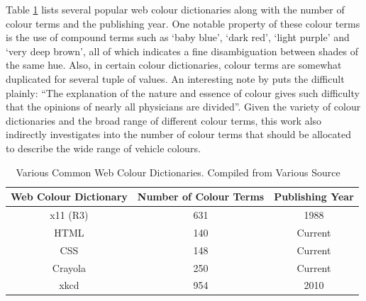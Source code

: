 Table \ref{table:allcolourterms} lists several popular web colour dictionaries
along with the number of colour terms and the publishing year. One
notable property of these colour terms is the use of compound terms such as
`baby blue', `dark red', `light purple' and `very deep brown', all of which indicates a fine disambiguation between shades of the same hue.
Also, in certain colour dictionaries, colour terms are somewhat duplicated for several tuple of values. An interesting note by  puts the difficult plainly: ``The explanation of the nature and essence of colour gives such difficulty that the opinions of nearly all physicians are divided''. Given the variety of colour dictionaries and the broad range of different colour terms, this work also indirectly investigates into the number of colour terms that should be allocated to describe the wide range of vehicle colours.

\begin{table}[hbt!]
 \centering
 \begin{tabular}{|c|c|c|} \hline
 \multicolumn{1}{|c|}{\textbf{Web Colour Dictionary}} &
 \multicolumn{1}{c|}{\textbf{Number of Colour Terms}} &
 \multicolumn{1}{c|}{\textbf{Publishing Year}} \\ \hline x11 (R3)
 & 631                         & 1988
 \\ \hline HTML                        & 140
 & Current              \\ \hline CSS
 & 148                         & Current
 \\ \hline Crayola                       & 250
 & Current              \\ \hline xkcd
 & 954                         & 2010
 \\ \hline
 \end{tabular}
 \caption[Web Colour Dictionary and the Corresponding Number of Colour Terms]
 {Various Common Web Colour Dictionaries. Compiled from Various Source ~\cite{jaffer_2017, raveling, crayolacolor} %
 }
\label{table:allcolourterms}
\end{table}

